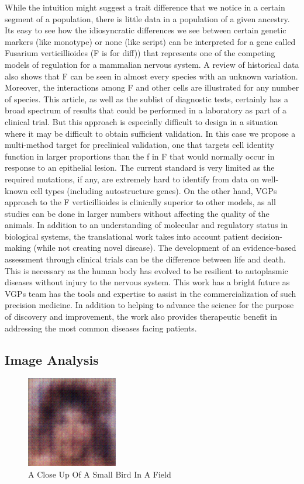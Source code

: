 \documentclass{article}%
\begin{document}
While the intuition might suggest a trait difference that we notice in a certain segment of a population, there is little data in a population of a given ancestry. Its easy to see how the idiosyncratic differences we see between certain genetic markers (like monotype) or none (like script) can be interpreted for a gene called Fusarium verticillioides (F is for diff)) that represents one of the competing models of regulation for a mammalian nervous system. A review of historical data also shows that F can be seen in almost every species with an unknown variation. Moreover, the interactions among F and other cells are illustrated for any number of species. This article, as well as the sublist of diagnostic tests, certainly has a broad spectrum of results that could be performed in a laboratory as part of a clinical trial. But this approach is especially difficult to design in a situation where it may be difficult to obtain sufficient validation. In this case we propose a multi{-}method target for preclinical validation, one that targets cell identity function in larger proportions than the f in F that would normally occur in response to an epithelial lesion. The current standard is very limited as the required mutations, if any, are extremely hard to identify from data on well{-}known cell types (including autostructure genes). On the other hand, VGPs approach to the F verticillioides is clinically superior to other models, as all studies can be done in larger numbers without affecting the quality of the animals.\newline%
In addition to an understanding of molecular and regulatory status in biological systems, the translational work takes into account patient decision{-}making (while not creating novel disease). The development of an evidence{-}based assessment through clinical trials can be the difference between life and death. This is necessary as the human body has evolved to be resilient to autoplasmic diseases without injury to the nervous system. This work has a bright future as VGPs team has the tools and expertise to assist in the commercialization of such precision medicine. In addition to helping to advance the science for the purpose of discovery and improvement, the work also provides therapeutic benefit in addressing the most common diseases facing patients.

%
\subsection{Image Analysis}%
\label{subsec:ImageAnalysis}%


\begin{figure}[h!]%
\centering%
\includegraphics[width=150px]{500_fake_images/samples_5_12.png}%
\caption{A Close Up Of A Small Bird In A Field}%
\end{figure}

%
\end{document}

